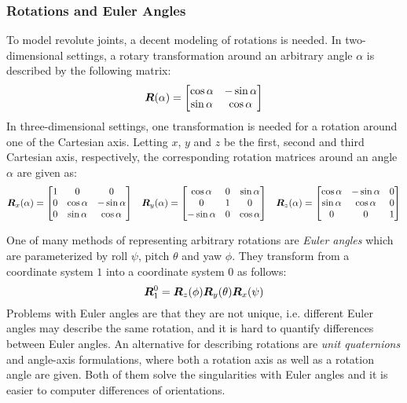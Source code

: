 			\subsubsection{Rotations and Euler Angles}
				To model revolute joints, a decent modeling of rotations is needed. In two-dimensional settings, a rotary transformation around an arbitrary angle \(\alpha\) is described by the following matrix:
				\begin{equation*}
					\bm{R}(\alpha) =
					\begin{bmatrix}
						\cos\alpha & -\sin\alpha \\
						\sin\alpha & \cos\alpha
					\end{bmatrix}
				\end{equation*}
				In three-dimensional settings, one transformation is needed for a rotation around one of the Cartesian axis. Letting \(x\), \(y\) and \(z\) be the first, second and third Cartesian axis, respectively, the corresponding rotation matrices around an angle \(\alpha\) are given as:
				\begin{align*}
					\bm{R}_x(\alpha) =
					\begin{bmatrix}
						1 & 0          & 0           \\
						0 & \cos\alpha & -\sin\alpha \\
						0 & \sin\alpha & \cos\alpha
					\end{bmatrix}
					 &  &
					\bm{R}_y(\alpha) =
					\begin{bmatrix}
						\cos\alpha  & 0 & \sin\alpha \\
						0           & 1 & 0          \\
						-\sin\alpha & 0 & \cos\alpha
					\end{bmatrix}
					 &  &
					\bm{R}_z(\alpha) =
					\begin{bmatrix}
						\cos\alpha & -\sin\alpha & 0 \\
						\sin\alpha & \cos\alpha  & 0 \\
						0          & 0           & 1
					\end{bmatrix}
				\end{align*}

				One of many methods of representing arbitrary rotations are \emph{Euler angles} which are parameterized by roll \(\psi\), pitch \(\theta\) and yaw \(\phi\). They transform from a coordinate system \(1\) into a coordinate system \(0\) as follows:
				\begin{equation*}
					\bm{R}_1^0 = \bm{R}_z(\phi) \bm{R}_y(\theta) \bm{R}_x(\psi)
				\end{equation*}
				Problems with Euler angles are that they are not unique, i.e. different Euler angles may describe the same rotation, and it is hard to quantify differences between Euler angles. An alternative for describing rotations are \emph{unit quaternions} and angle-axis formulations, where both a rotation axis as well as a rotation angle are given. Both of them solve the singularities with Euler angles and it is easier to computer differences of orientations.


